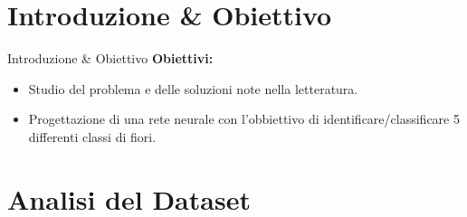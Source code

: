 \documentclass[9pt,serif,usenames,dvipsnames]{beamer}
\begin{document}
	\section{Introduzione \& Obiettivo}

	\begin{frame}{\centering Introduzione \& Obiettivo}
		\textbf{Obiettivi:}
		\begin{itemize}
			\item Studio del problema e delle soluzioni note nella letteratura.
			\item Progettazione di una rete neurale con l'obbiettivo di identificare/classificare 5 differenti classi di fiori.
		\end{itemize}
	\end{frame}

	\section{Analisi del Dataset}
\end{document}
